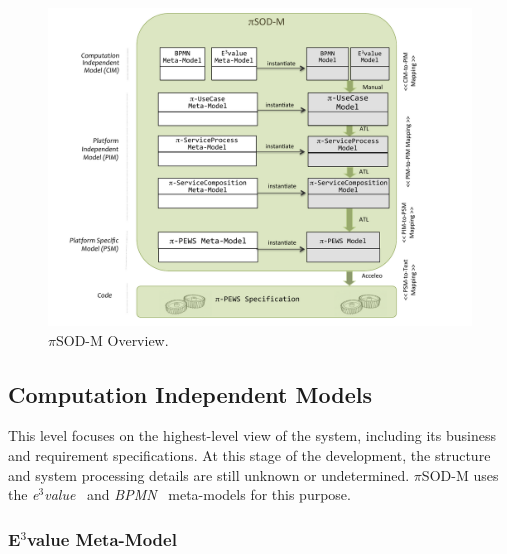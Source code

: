 \documentclass{singlecol-new}
\theoremstyle{TH}{
\newtheorem{lemma}{Lemma}
\newtheorem{theorem}[lemma]{Theorem}
\newtheorem{corrolary}[lemma]{Corrolary}
\newtheorem{conjecture}[lemma]{Conjecture}
\newtheorem{proposition}[lemma]{Proposition}
\newtheorem{claim}[lemma]{Claim}
\newtheorem{stheorem}[lemma]{Wrong Theorem}
\newtheorem{algorithm}{Algorithm}
}
\theoremstyle{THrm}{
\newtheorem{definition}{Definition}[section]
\newtheorem{question}{Question}[section]
\newtheorem{remark}{Remark}
\newtheorem{scheme}{Scheme}
}
\theoremstyle{THhit}{
\newtheorem{case}{Case}[section]
}
\theoremstyle{THhsl}{
\newtheorem{example}{Example}
}
\newcommand{\pisodm}[0]{$\pi$SOD-M\xspace}
\begin{document}
\begin{figure}[h]
\centering
\includegraphics[width=1\textwidth]{./figures/piSOD-M_process.pdf}
\caption{\pisodm Overview.}
\label{fig:piSOD-M}
\end{figure}



\subsection{Computation Independent Models}

This level focuses on the highest-level view of the system, including its business and requirement specifications.
At this stage of the development, the structure and system processing details are still unknown or undetermined.
\pisodm uses the \textit{e$^3$value}~\cite{Gordijn02valuebased} and \textit{BPMN}~\cite{BPMN} meta-models for this purpose.

\subsubsection{E$^3$value Meta-Model}
\end{document}
